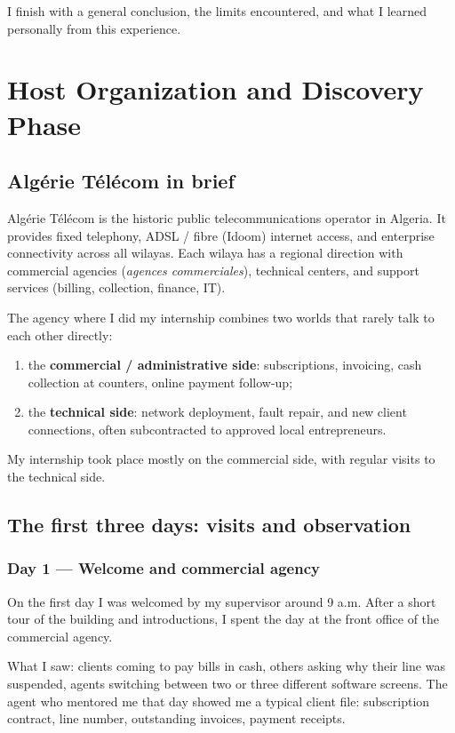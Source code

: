\documentclass[12pt,a4paper]{report}
\begin{document}
I finish with a general conclusion, the limits encountered, and what I learned personally from this experience.

\chapter{Host Organization and Discovery Phase}

\section{Algérie Télécom in brief}

Algérie Télécom is the historic public telecommunications operator in Algeria. It provides fixed telephony, ADSL / fibre (Idoom) internet access, and enterprise connectivity across all wilayas. Each wilaya has a regional direction with commercial agencies (\textit{agences commerciales}), technical centers, and support services (billing, collection, finance, IT).

The agency where I did my internship combines two worlds that rarely talk to each other directly:
\begin{enumerate}
\item the \textbf{commercial / administrative side}: subscriptions, invoicing, cash collection at counters, online payment follow-up;
\item the \textbf{technical side}: network deployment, fault repair, and new client connections, often subcontracted to approved local entrepreneurs.
\end{enumerate}

My internship took place mostly on the commercial side, with regular visits to the technical side.

\section{The first three days: visits and observation}

\subsection{Day 1 --- Welcome and commercial agency}

On the first day I was welcomed by my supervisor around 9 a.m. After a short tour of the building and introductions, I spent the day at the front office of the commercial agency.

What I saw: clients coming to pay bills in cash, others asking why their line was suspended, agents switching between two or three different software screens. The agent who mentored me that day showed me a typical client file: subscription contract, line number, outstanding invoices, payment receipts.
\end{document}
